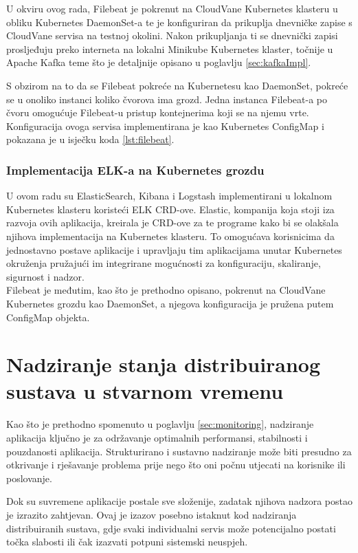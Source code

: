 \documentclass[times, utf8, diplomski]{fer}
\begin{document}
U okviru ovog rada, Filebeat je pokrenut na CloudVane Kubernetes klasteru u obliku Kubernetes DaemonSet-a te je konfiguriran da prikuplja dnevničke zapise s CloudVane servisa na testnoj okolini. Nakon prikupljanja ti se dnevnički zapisi prosljeđuju preko interneta na lokalni Minikube Kubernetes klaster, točnije u Apache Kafka teme što je detaljnije opisano u poglavlju \ref{sec:kafkaImpl}. 

S obzirom na to da se Filebeat pokreće na Kubernetesu kao DaemonSet, pokreće se u onoliko instanci koliko čvorova ima grozd. Jedna instanca Filebeat-a po čvoru omogućuje Filebeat-u pristup kontejnerima koji se na njemu vrte. Konfiguracija ovoga servisa implementirana je kao Kubernetes ConfigMap i pokazana je u isječku koda \ref{lst:filebeat}.

\subsection{Implementacija ELK-a na Kubernetes grozdu}
\label{sec:elk_impl}

U ovom radu su ElasticSearch, Kibana i Logstash implementirani u lokalnom Kubernetes klasteru koristeći ELK CRD-ove. Elastic, kompanija koja stoji iza razvoja ovih aplikacija, kreirala je CRD-ove za te programe kako bi se olakšala njihova implementacija na Kubernetes klasteru. To omogućava korisnicima da jednostavno postave aplikacije i upravljaju tim aplikacijama unutar Kubernetes okruženja pružajući im integrirane mogućnosti za konfiguraciju, skaliranje, sigurnost i nadzor.\\

Filebeat je međutim, kao što je prethodno opisano, pokrenut na CloudVane Kubernetes grozdu kao DaemonSet, a njegova konfiguracija je pružena putem ConfigMap objekta.

\chapter{Nadziranje stanja distribuiranog sustava u stvarnom vremenu}
\label{sec:streamingMonitoring}

Kao što je prethodno spomenuto u poglavlju \ref{sec:monitoring}, nadziranje aplikacija ključno je za održavanje optimalnih performansi, stabilnosti i pouzdanosti aplikacija. Strukturirano i sustavno nadziranje može biti presudno za otkrivanje i rješavanje problema prije nego što oni počnu utjecati na korisnike ili poslovanje.

Dok su suvremene aplikacije postale sve složenije, zadatak njihova nadzora postao je izrazito zahtjevan. Ovaj je izazov posebno istaknut kod nadziranja distribuiranih sustava, gdje svaki individualni servis može potencijalno postati točka slabosti ili čak izazvati potpuni sistemski neuspjeh.
\end{document}
